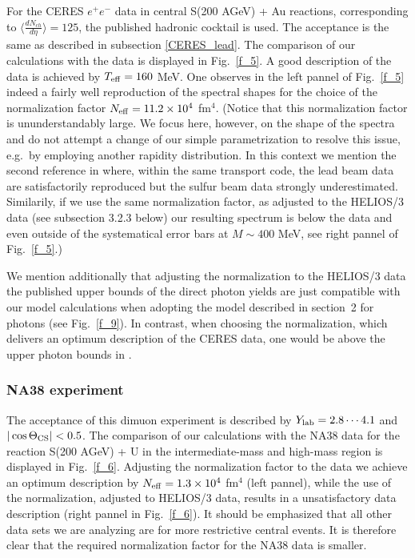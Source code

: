 For the CERES $e^+ e^-$ data \cite{CERES_S} in central 
S(200 AGeV) + Au reactions, corresponding to 
$\langle \frac{dN_{ch}}{d \eta} \rangle = 125$,
the published hadronic cocktail is used.
The acceptance is the same as described in subsection \ref{CERES_lead}.
The comparison of our calculations with the data is displayed in 
Fig.~\ref{f_5}. A good description of the data is achieved
by $T_{\rm eff} = 160$ MeV. One observes in the left pannel of
Fig.~\ref{f_5} indeed a fairly well 
reproduction of the spectral shapes for the choice of the
normalization factor $N_{\rm eff} = 11.2 \times 10^4$ fm${}^4$.
(Notice that this normalization factor is ununderstandably large.
We focus here, however, on the shape of the spectra
and do not attempt a change of our simple parametrization to resolve this
issue, e.g.\ by employing another rapidity distribution.
In this context we mention the second reference in
\cite{V.Koch} where, within the same transport code, the lead beam
data \cite{CERES_Pb} are satisfactorily reproduced but the sulfur
beam data \cite{CERES_S} strongly underestimated.
Similarily, if we use the same normalization factor, as adjusted to
the HELIOS/3 data (see subsection 3.2.3 below) our resulting spectrum
is below the data and even outside of the systematical error bars
at $M \sim 400$ MeV, see right pannel of Fig.~\ref{f_5}.)

We mention additionally that adjusting the normalization to the HELIOS/3 data
\cite{HELIOS-3} 
the published upper bounds of the direct photon yields \cite{WA80} 
are just compatible with our
model calculations when adopting the model described in section~2 
for photons \cite{our_photons}
(see Fig.~\ref{f_9}). In contrast, when choosing the
normalization, which delivers an optimum description of the CERES
data, one would be above the upper photon bounds in \cite{WA80}.

\subsubsection{NA38 experiment} %

The acceptance of this dimuon experiment is described by
$Y_{\rm lab} = 2.8 \cdots 4.1$ and
$\vert \cos \Theta_{\rm CS} \vert < 0.5$.
The comparison of our calculations with the NA38 data \cite{NA38}
for the reaction S(200 AGeV) + U
in the intermediate-mass and high-mass region is displayed in
Fig.~\ref{f_6}. Adjusting the normalization factor to the data
we achieve an optimum description by 
$N_{\rm eff} = 1.3 \times 10^4$ fm${}^4$ (left pannel),
while the use of the normalization, adjusted to HELIOS/3 data,
results in a unsatisfactory data description
(right pannel in Fig.~\ref{f_6}). 
It should be emphasized that all other data sets we are analyzing
are for more restrictive central events. It is therefore clear that
the required normalization factor for the NA38 data is smaller.

